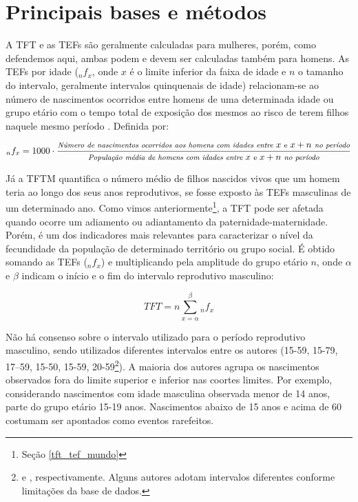 \section{Principais bases e métodos}\label{bases_e_metodos-ref}


A TFT e as TEFs são geralmente calculadas para mulheres, porém, como defendemos aqui, ambas podem e devem ser calculadas também para homens. As TEFs por idade (${}_n{f}_x$, onde $x$ é o limite inferior da faixa de idade e $n$ o tamanho do intervalo, geralmente intervalos quinquenais de idade) relacionam-se ao número de nascimentos ocorridos entre homens de uma determinada idade ou grupo etário com o tempo total de exposição dos mesmos ao risco de terem filhos naquele mesmo período \cite{FOZ2021metodos}. Definida por:

\begin{equation}\label{tefmEqu}
{}_n{f}_x = 1000 \cdot \frac{\text{\footnotesize \textit{Número de nascimentos ocorridos aos homens com idades entre} } x \text{ \footnotesize e } x + n \text{ \footnotesize \textit{no período}}}{\text{\footnotesize \textit{População média de homens com idades entre} } x \text{ \footnotesize e } x + n \text{ \footnotesize \textit{no período}}} \\
\end{equation}

Já a TFTM quantifica o número médio de filhos nascidos vivos que um homem teria ao longo dos seus anos reprodutivos, se fosse exposto às TEFs masculinas de um determinado ano. Como vimos anteriormente\footnote{Seção \ref{tft_tef_mundo}}, a TFT pode ser afetada quando ocorre um adiamento ou adiantamento da paternidade-maternidade. Porém, é um dos indicadores mais relevantes para caracterizar o nível da fecundidade da população de determinado território ou grupo social. É obtido somando as TEFs (${}_n{f}_x$) e multiplicando pela amplitude do grupo etário $n$, onde $\alpha$ e $\beta$ indicam o início e o fim do intervalo reprodutivo masculino:

\begin{equation} \label{tftEqu}
TFT = n \sum_{x=\alpha}^{\beta} {}_n{f}_x
\end{equation}


Não há consenso sobre o intervalo utilizado para o período reprodutivo masculino, sendo utilizados diferentes intervalos entre os autores (15-59, 15-79, 17–59, 15-50, 15-59, 20-59\footnote{ e , respectivamente. Alguns autores adotam intervalos diferentes conforme limitações da base de dados.}). A maioria dos autores agrupa os nascimentos observados fora do limite superior e inferior nas coortes limites. Por exemplo, considerando nascimentos com idade masculina observada menor de 14 anos, parte do grupo etário 15-19 anos. Nascimentos abaixo de 15 anos e acima de 60 costumam ser apontados como eventos rarefeitos.  
  

